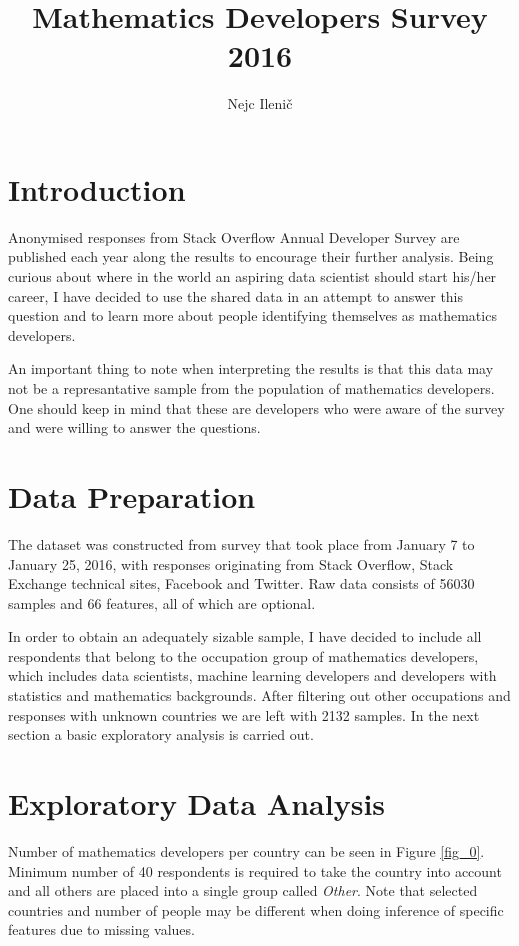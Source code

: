 \documentclass[9pt]{article}
\begin{document}





\title{Mathematics Developers Survey 2016}
\author{Nejc Ileni\v{c}}
\date{}
\maketitle

\section{Introduction}
Anonymised responses from Stack Overflow Annual Developer Survey are published each year along the results to encourage their further analysis. Being curious about where in the world an aspiring data scientist should start his/her career, I have decided to use the shared data in an attempt to answer this question and to learn more about people identifying themselves as mathematics developers.

\vspace{3mm}

An important thing to note when interpreting the results is that this data may not be a represantative sample from the population of mathematics developers. One should keep in mind that these are developers who were aware of the survey and were willing to answer the questions.

\section{Data Preparation}
The dataset was constructed from survey that took place from January 7 to January 25, 2016, with responses originating from Stack Overflow, Stack Exchange technical sites, Facebook and Twitter. Raw data consists of 56030 samples and 66 features, all of which are optional.

\vspace{3mm}

In order to obtain an adequately sizable sample, I have decided to include all respondents that belong to the occupation group of mathematics developers, which includes data scientists, machine learning developers and developers with statistics and mathematics backgrounds. After filtering out other occupations and responses with unknown countries we are left with 2132 samples. In the next section a basic exploratory analysis is carried out.

\section{Exploratory Data Analysis}
Number of mathematics developers per country can be seen in Figure \ref{fig_0}. Minimum number of 40 respondents is required to take the country into account and all others are placed into a single group called \textit{Other}. Note that selected countries and number of people may be different when doing inference of specific features due to missing values.
\end{document}
